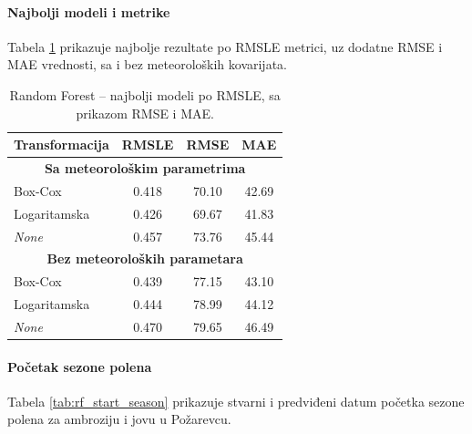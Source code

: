 \documentclass[12pt]{article}
\begin{document}
\paragraph{\textbf{Najbolji modeli i metrike}}  
Tabela \ref{tab:rf_best_models} prikazuje najbolje rezultate po RMSLE metrici, uz dodatne RMSE i MAE vrednosti, sa i bez meteoroloških kovarijata.

\begin{table}[h!]
\centering
\caption{Random Forest – najbolji modeli po RMSLE, sa prikazom RMSE i MAE.}
\label{tab:rf_best_models}
\renewcommand{\arraystretch}{1.2}
\begin{tabular}{|l|c|c|c|}
\hline
\textbf{Transformacija} & \textbf{RMSLE} & \textbf{RMSE} & \textbf{MAE} \\ \hline
\multicolumn{4}{|c|}{\textbf{Sa meteorološkim parametrima}} \\ \hline
Box-Cox & 0.418 & 70.10 & 42.69 \\ \hline
Logaritamska     & 0.426 & 69.67 & 41.83 \\ \hline
\textit{None}    & 0.457 & 73.76 & 45.44 \\ \hline
\multicolumn{4}{|c|}{\textbf{Bez meteoroloških parametara}} \\ \hline
Box-Cox & 0.439 & 77.15 & 43.10 \\ \hline
Logaritamska     & 0.444 & 78.99 & 44.12 \\ \hline
\textit{None}    & 0.470 & 79.65 & 46.49 \\ \hline
\end{tabular}
\end{table}

\paragraph{\textbf{Početak sezone polena}}
Tabela \ref{tab:rf_start_season} prikazuje stvarni i predviđeni datum početka sezone polena za ambroziju i jovu u Požarevcu.
\end{document}
